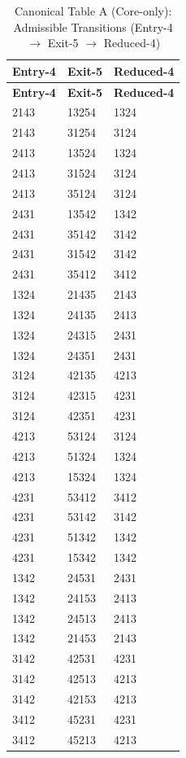 \documentclass[11pt]{article}
\begin{document}
\begin{longtable}{lll}
\caption{Canonical Table A (Core-only): Admissible Transitions (Entry-4 $\rightarrow$ Exit-5 $\rightarrow$ Reduced-4)}
\label{tab:canonical_table_a}\\
\hline
\textbf{Entry-4} & \textbf{Exit-5} & \textbf{Reduced-4} \\
\hline
\endfirsthead

\hline
\textbf{Entry-4} & \textbf{Exit-5} & \textbf{Reduced-4} \\
\hline
\endhead

\hline
\endfoot

\hline
\endlastfoot

2143 & 13254 & 1324 \\
2143 & 31254 & 3124 \\

2413 & 13524 & 1324 \\
2413 & 31524 & 3124 \\
2413 & 35124 & 3124 \\

2431 & 13542 & 1342 \\
2431 & 35142 & 3142 \\
2431 & 31542 & 3142 \\
2431 & 35412 & 3412 \\

1324 & 21435 & 2143 \\
1324 & 24135 & 2413 \\
1324 & 24315 & 2431 \\
1324 & 24351 & 2431 \\

3124 & 42135 & 4213 \\
3124 & 42315 & 4231 \\
3124 & 42351 & 4231 \\

4213 & 53124 & 3124 \\
4213 & 51324 & 1324 \\
4213 & 15324 & 1324 \\

4231 & 53412 & 3412 \\
4231 & 53142 & 3142 \\
4231 & 51342 & 1342 \\
4231 & 15342 & 1342 \\

1342 & 24531 & 2431 \\
1342 & 24153 & 2413 \\
1342 & 24513 & 2413 \\
1342 & 21453 & 2143 \\

3142 & 42531 & 4231 \\
3142 & 42513 & 4213 \\
3142 & 42153 & 4213 \\

3412 & 45231 & 4231 \\
3412 & 45213 & 4213 \\

\end{longtable}
\end{document}

